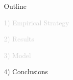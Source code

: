 \documentclass[aspectratio=169]{beamer}
\begin{document}






\begin{frame}[noframenumbering]{Outline}

\Large

\textcolor{lightgray}{1) Empirical Strategy}

\vspace{5mm}

\textcolor{lightgray}{2) Results}

\vspace{5mm}

\textcolor{lightgray}{3) Model}

\vspace{5mm}

4) Conclusions


\end{frame}
\end{document}
